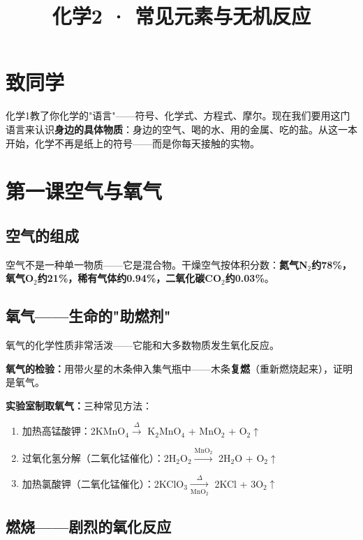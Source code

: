 \documentclass[a4paper,12pt]{ctexart}
\title{\textcolor{blue!70!black}{\Huge\textbf{化学2 · 常见元素与无机反应}}}
\author{}\date{}
\begin{document}
\maketitle\thispagestyle{empty}
\section*{\textcolor{blue!70!black}{致同学}}
化学1教了你化学的"语言"——符号、化学式、方程式、摩尔。现在我们要用这门语言来认识\textbf{身边的具体物质}：身边的空气、喝的水、用的金属、吃的盐。从这一本开始，化学不再是纸上的符号——而是你每天接触的实物。

\newpage
\section{\textcolor{orange!80!black}{第一课\quad 空气与氧气}}

\subsection*{空气的组成}

空气不是一种单一物质——它是混合物。干燥空气按体积分数：\textbf{氮气N$_2$约78\%，氧气O$_2$约21\%，稀有气体约0.94\%，二氧化碳CO$_2$约0.03\%}。

\subsection*{氧气——生命的"助燃剂"}

氧气的化学性质非常活泼——它能和大多数物质发生氧化反应。

\textbf{氧气的检验：}用带火星的木条伸入集气瓶中——木条\textbf{复燃}（重新燃烧起来），证明是氧气。

\textbf{实验室制取氧气：}三种常见方法：
\begin{enumerate}
  \item 加热高锰酸钾：2KMnO$_4 \xrightarrow{\Delta}$ K$_2$MnO$_4$ + MnO$_2$ + O$_2$$\uparrow$
  \item 过氧化氢分解（二氧化锰催化）：2H$_2$O$_2 \xrightarrow{\text{MnO}_2}$ 2H$_2$O + O$_2$$\uparrow$
  \item 加热氯酸钾（二氧化锰催化）：2KClO$_3 \xrightarrow[\text{MnO}_2]{\Delta}$ 2KCl + 3O$_2$$\uparrow$
\end{enumerate}

\subsection*{燃烧——剧烈的氧化反应}
\end{document}
